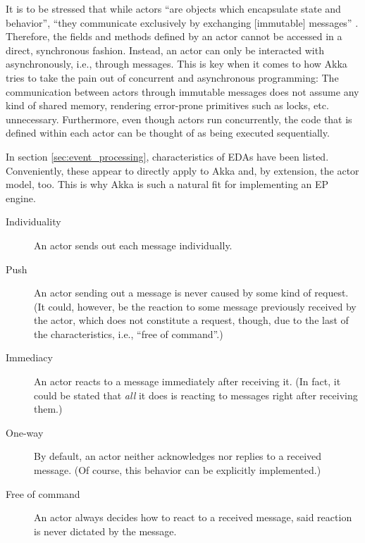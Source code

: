 \documentclass[article, 10pt, type=bsc, colorback, accentcolor=tud8b, parskip=half, bibliography=totocnumbered]{tudthesis}
\begin{document}
It is to be stressed that while actors ``are objects which encapsulate state and behavior'', ``they communicate exclusively by exchanging [immutable] messages'' \cite{akkadoc}.
Therefore, the fields and methods defined by an actor cannot be accessed in a direct, synchronous fashion.
Instead, an actor can only be interacted with asynchronously, i.e., through messages.
This is key when it comes to how Akka tries to take the pain out of concurrent and asynchronous programming:
The communication between actors through immutable messages does not assume any kind of shared memory, rendering error-prone primitives such as locks, etc. unnecessary.
Furthermore, even though actors run concurrently, the code that is defined within each actor can be thought of as being executed sequentially.

In section \ref{sec:event_processing}, characteristics of EDAs \cite{Chandy:2009:EPD:1594754} have been listed.
Conveniently, these appear to directly apply to Akka and, by extension, the actor model, too.
This is why Akka is such a natural fit for implementing an EP engine.

\begin{description}
\item[Individuality]
An actor sends out each message individually.
\item[Push]
An actor sending out a message is never caused by some kind of request.
(It could, however, be the reaction to some message previously received by the actor, which does not constitute a request, though, due to the last of the characteristics, i.e., ``free of command''.)
\item[Immediacy]
An actor reacts to a message immediately after receiving it.
(In fact, it could be stated that \emph{all} it does is reacting to messages right after receiving them.)
\item[One-way]
By default, an actor neither acknowledges nor replies to a received message. (Of course, this behavior can be explicitly implemented.)
\item[Free of command]
An actor always decides how to react to a received message, said reaction is never dictated by the message.
\end{description}
\end{document}
